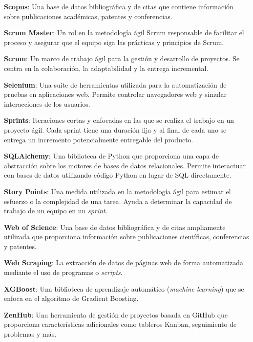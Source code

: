 \textbf{Scopus}: Una base de datos bibliográfica y de citas que contiene información sobre publicaciones académicas, patentes y conferencias.

\textbf{Scrum Master}: Un rol en la metodología ágil Scrum responsable de facilitar el proceso y asegurar que el equipo siga las prácticas y principios de Scrum.

\textbf{Scrum}: Un marco de trabajo ágil para la gestión y desarrollo de proyectos. Se centra en la colaboración, la adaptabilidad y la entrega incremental.

\textbf{Selenium}: Una suite de herramientas utilizada para la automatización de pruebas en aplicaciones web. Permite controlar navegadores web y simular interacciones de los usuarios.

\textbf{Sprints}: Iteraciones cortas y enfocadas en las que se realiza el trabajo en un proyecto ágil. Cada sprint tiene una duración fija y al final de cada uno se entrega un incremento potencialmente entregable del producto.

\textbf{SQLAlchemy}: Una biblioteca de Python que proporciona una capa de abstracción sobre los motores de bases de datos relacionales. Permite interactuar con bases de datos utilizando código Python en lugar de SQL directamente.

\textbf{Story Points}: Una medida utilizada en la metodología ágil para estimar el esfuerzo o la complejidad de una tarea. Ayuda a determinar la capacidad de trabajo de un equipo en un \textit{sprint}.

\textbf{Web of Science}: Una base de datos bibliográfica y de citas ampliamente utilizada que proporciona información sobre publicaciones científicas, conferencias y patentes.

\textbf{Web Scraping}: La extracción de datos de páginas web de forma automatizada mediante el uso de programas o \textit{scripts}.

\textbf{XGBoost}: Una biblioteca de aprendizaje automático (\textit{machine learning}) que se enfoca en el algoritmo de Gradient Boosting.

\textbf{ZenHub}: Una herramienta de gestión de proyectos basada en GitHub que proporciona características adicionales como tableros Kanban, seguimiento de problemas y más.

